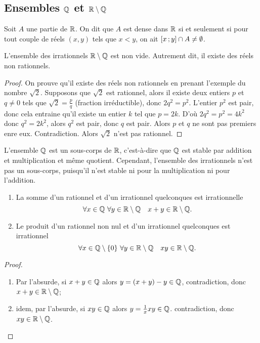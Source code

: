 \subsection{Ensembles $\mathbb{Q}$ et $\mathbb{R}\setminus\mathbb{Q}$}

\begin{defdef}[Densité]
  Soit $A$ une partie de $\mathbb{R}$. On dit que $A$ est dense dans $\mathbb{R}$ si et seulement si pour tout couple de réels $(x,y)$ tels que $x<y$, on ait $\left[ x \, ;  y \right]\cap A \neq \emptyset$.
\end{defdef}
\begin{prop}
  L'ensemble des irrationnels $\mathbb{R}\setminus\mathbb{Q}$ est non vide. Autrement dit, il existe des réels non rationnels.
\end{prop}
\begin{proof}
  On prouve  qu'il existe des réels non rationnels en prenant l'exemple du nombre $\sqrt{2}$. Supposons que $\sqrt{2}$ est rationnel, alors il existe deux entiers $p$ et $q \neq 0$ tels que $\sqrt{2}=\frac{p}{q}$ (fraction irréductible), donc $2q^2=p^2$. L'entier $p^2$ est pair, donc cela entraine qu'il existe un entier $k$ tel que $p=2k$. D'où $2q^2=p^2=4k^2$ donc $q^2=2k^2$, alors $q^2$ est pair, donc $q$ est pair. Alors $p$ et $q$ ne sont pas premiers enre eux. Contradiction. Alors $\sqrt{2}$ n'est pas rationnel.
\end{proof}

L'ensemble $\mathbb{Q}$ est un sous-corps de $\mathbb{R}$, c'est-à-dire que $\mathbb{Q}$ est stable par addition et multiplication et même quotient. Cependant, l'ensemble des irrationnels n'est pas un sous-corps, puisqu'il n'est stable ni pour la multiplication ni pour l'addition.

\begin{prop}
  \begin{enumerate}
  \item La somme d'un rationnel et d'un irrationnel quelconques est irrationnelle
    \begin{equation}
      \forall x \in \mathbb{Q} \ \forall y \in \mathbb{R}\setminus\mathbb{Q} \quad x+y \in \mathbb{R}\setminus\mathbb{Q}.
    \end{equation}
  \item Le produit d'un rationnel non nul et d'un irrationnel quelconques est irrationnel
    \begin{equation}
      \forall x \in \mathbb{Q}\setminus\{0\} \ \forall y \in \mathbb{R}\setminus\mathbb{Q} \quad xy \in \mathbb{R}\setminus\mathbb{Q}.
    \end{equation}
  \end{enumerate}
\end{prop}
\begin{proof}
  \begin{enumerate}
  \item Par l'absurde, si $x+y\in\mathbb{Q}$ alors $y=(x+y)-y \in \mathbb{Q}$, contradiction, donc $x+y\in\mathbb{R}\setminus\mathbb{Q}$;
  \item idem, par l'absurde, si $xy\in \mathbb{Q}$ alors $y=\frac{1}{x}xy\in\mathbb{Q}$. contradiction, donc $xy\in\mathbb{R}\setminus\mathbb{Q}$.
  \end{enumerate}
\end{proof}

